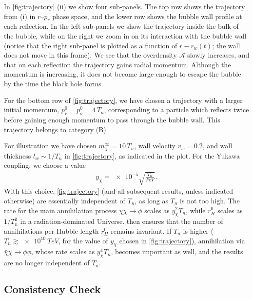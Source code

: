 \documentclass[
onecolumn, %
11pt, %
tightenlines,
superscriptaddress, %
nofootinbib, %
preprintnumbers, %
prd %
]{revtex4-1}
\newcommand{\A}{\ensuremath{\mathcal A}\xspace}
\begin{document}
In \cref{fig:trajectory} (ii) we show four sub-panels.  The top row shows the trajectory from (i) in $r$--$p_r$ phase space, and the lower row shows the bubble wall profile at each reflection.  In the left sub-panels we show the trajectory inside the bulk of the bubble, while on the right we zoom in on its interaction with the bubble wall (notice that the right sub-panel is plotted as a function of $r-r_w(t)$; the wall does not move in this frame).  We see that the overdensity $\A$ slowly increases, and that on each reflection the trajectory gains radial momentum.  Although the momentum is increasing, it does not become large enough to escape the bubble by the time the black hole forms.

For the bottom row of \cref{fig:trajectory}, we have chosen a trajectory with a larger initial momentum, $p_r^0 = p_\sigma^0 = 4\,T_n$, corresponding to a particle which reflects twice before gaining enough momentum to pass through the bubble wall.  This trajectory belongs to category (B).

For illustration we have chosen $m_\chi^\infty = 10\,T_n$, wall velocity $v_w = 0.2$, and wall thickness $l_w \sim 1/T_n$ in \cref{fig:trajectory}, as indicated in the plot. For the Yukawa coupling, we choose a value
%
\begin{align}
    y_\chi = \num{e-5} \sqrt{\frac{T_n}{\si{PeV}}} \,.
    \label{eq:ychi}
\end{align}
%
With this choice, \cref{fig:trajectory} (and all subsequent results, unless indicated otherwise) are essentially independent of $T_n$, as long as $T_n$ is not too high. The rate for the main annihilation process $\chi\bar\chi \to \phi$ scales as $y_\chi^2 T_n$, while $r_H^0$ scales as $1/T_n^2$ in a radiation-dominated Universe.  then ensures that the number of annihilations per Hubble length $r_H^0$ remains invariant.  If $T_n$ is higher ($T_n \gtrsim \SI{e10}{TeV}$, for the value of $y_\chi$ chosen in \cref{fig:trajectory}), annihilation via $\bar\chi \chi \to \phi\phi$, whose rate scales as $y_\chi^4 T_n$, becomes important as well, and the results are no longer independent of $T_n$.


\subsection{Consistency Check}
\label{sec:continuity}
\end{document}
